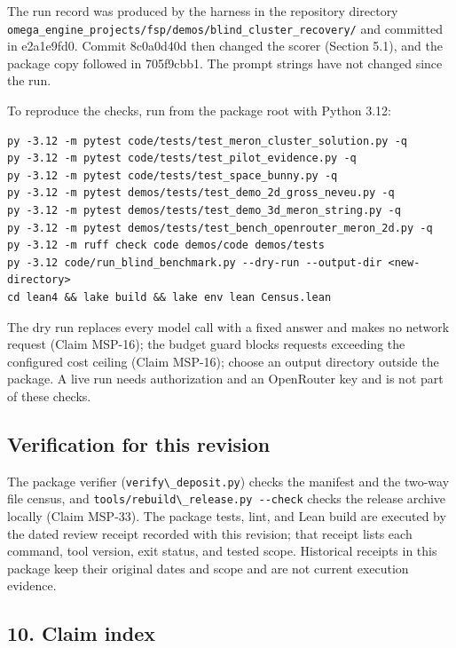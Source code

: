 \documentclass[
  11pt,
]{article}
\newcommand{\passthrough}[1]{#1}
\begin{document}
The run record was produced by the harness in the repository directory
\nolinkurl{omega_engine_projects/fsp/demos/blind_cluster_recovery/} and
committed in e2a1e9fd0. Commit 8c0a0d40d then changed the scorer
(Section 5.1), and the package copy followed in 705f9cbb1. The prompt
strings have not changed since the run.

To reproduce the checks, run from the package root with Python 3.12:

\begin{lstlisting}
py -3.12 -m pytest code/tests/test_meron_cluster_solution.py -q
py -3.12 -m pytest code/tests/test_pilot_evidence.py -q
py -3.12 -m pytest code/tests/test_space_bunny.py -q
py -3.12 -m pytest demos/tests/test_demo_2d_gross_neveu.py -q
py -3.12 -m pytest demos/tests/test_demo_3d_meron_string.py -q
py -3.12 -m pytest demos/tests/test_bench_openrouter_meron_2d.py -q
py -3.12 -m ruff check code demos/code demos/tests
py -3.12 code/run_blind_benchmark.py --dry-run --output-dir <new-directory>
cd lean4 && lake build && lake env lean Census.lean
\end{lstlisting}

The dry run replaces every model call with a fixed answer and makes no
network request (Claim MSP-16); the budget guard blocks requests
exceeding the configured cost ceiling (Claim MSP-16); choose an output
directory outside the package. A live run needs authorization and an
OpenRouter key and is not part of these checks.

\subsection{Verification for this
revision}\label{verification-for-this-revision}

The package verifier (\passthrough{\lstinline!verify\_deposit.py!})
checks the manifest and the two-way file census, and
\passthrough{\lstinline!tools/rebuild\_release.py --check!} checks the
release archive locally (Claim MSP-33). The package tests, lint, and
Lean build are executed by the dated review receipt recorded with this
revision; that receipt lists each command, tool version, exit status,
and tested scope. Historical receipts in this package keep their
original dates and scope and are not current execution evidence.

\subsection{10. Claim index}\label{claim-index}
\end{document}
